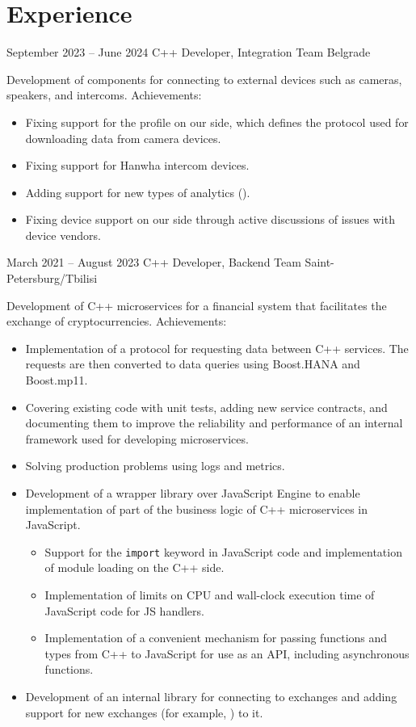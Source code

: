 \documentclass[11pt,a4paper,sans]{moderncv}
\begin{document}
\makecvtitle

\section{Experience}
\cventry
{September 2023 -- June 2024}
{C++ Developer, Integration Team}
{}
{Belgrade}
{}
{Development of components for connecting to external devices such as cameras, speakers, and intercoms.\newline{}
Achievements:
\begin{itemize}
\item Fixing support for the  profile on our side, which defines the protocol used for downloading data from camera devices.
\item Fixing support for Hanwha intercom devices.
\item Adding support for new types of analytics ().
\item Fixing device support on our side through active discussions of issues with device vendors.
\end{itemize}}

\cventry
{March 2021 -- August 2023}
{C++ Developer, Backend Team}
{}
{Saint-Petersburg/Tbilisi}
{}
{Development of C++ microservices for a financial system that facilitates the exchange of cryptocurrencies.\newline{}
Achievements:
\begin{itemize}
\item Implementation of a protocol for requesting data between C++ services. The requests are then converted to data queries using Boost.HANA and Boost.mp11.
\item Covering existing code with unit tests, adding new service contracts, and documenting them to improve the reliability and performance of an internal framework used for developing microservices.
\item Solving production problems using logs and metrics.
\item Development of a wrapper library over  JavaScript Engine to enable implementation of part of the business logic of C++ microservices in JavaScript.
  \begin{itemize}
  \item Support for the \texttt{import} keyword in JavaScript code and implementation of module loading on the C++ side.
  \item Implementation of limits on CPU and wall-clock execution time of JavaScript code for JS handlers.
  \item Implementation of a convenient mechanism for passing functions and types from C++ to JavaScript for use as an API, including asynchronous functions.
  \end{itemize}
\item Development of an internal library for connecting to exchanges and adding support for new exchanges (for example, ) to it.
\end{itemize}}
\end{document}
